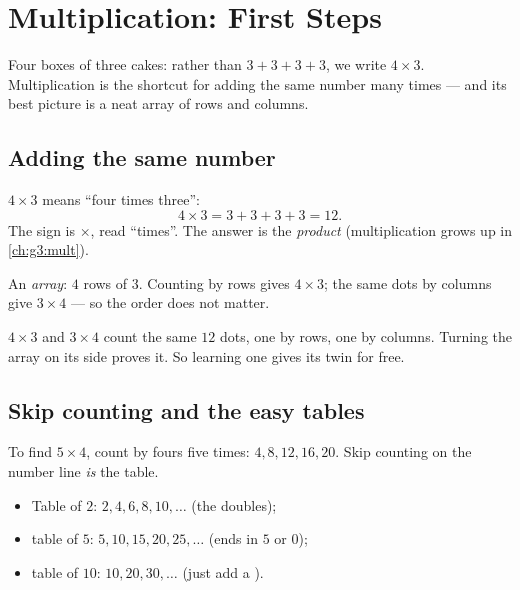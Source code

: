 \chapter{Multiplication: First Steps}\label{ch:g2:mult}

Four boxes of three cakes: rather than $3 + 3 + 3 + 3$, we write
$4 \times 3$. Multiplication is the shortcut for adding the same
number many times --- and its best picture is a neat array of rows
and columns.

\section{Adding the same number}

\begin{definition}[Multiplication]\label{def:g2:mult:def}
$4 \times 3$ means ``four times three'':
\[
4 \times 3 = 3 + 3 + 3 + 3 = 12 .
\]
The sign is $\times$, read ``times''. The answer is the
\emph{product} (multiplication grows up in \cref{ch:g3:mult}).
\end{definition}

\begin{omfigure}

{\small An \emph{array}: $4$ rows of $3$. Counting by rows gives
$4 \times 3$; the same dots by columns give $3 \times 4$ --- so the
order does not matter.}
\end{omfigure}

\begin{example}\label{ex:g2:mult:order}
$4 \times 3$ and $3 \times 4$ count the same $12$ dots, one by
rows, one by columns. Turning the array on its side proves it. So
learning one  gives its twin for free.
\end{example}

\section{Skip counting and the easy tables}

\begin{method}\label{met:g2:mult:skip}
To find $5 \times 4$, count by fours five times:
$4, 8, 12, 16, 20$. Skip counting on the number line \emph{is} the
table.
\begin{itemize}
  \item Table of $2$: $2, 4, 6, 8, 10, \dots$ (the doubles);
  \item table of $5$: $5, 10, 15, 20, 25, \dots$ (ends in $5$ or
        $0$);
  \item table of $10$: $10, 20, 30, \dots$ (just add a ).
\end{itemize}
\end{method}

